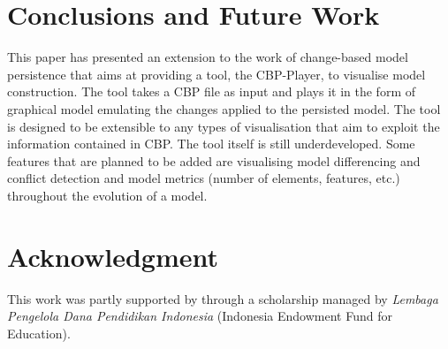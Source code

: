 \documentclass[conference]{IEEEtran}
\begin{document}
\section{Conclusions and Future Work}
\label{sec:conclusions_and_future_work}
This paper has presented an extension to the work of change-based model persistence
that aims at providing a tool, the CBP-Player, to visualise model construction. 
The tool takes a CBP file as input and plays it in the form of graphical model
emulating the changes applied to the persisted model. 
The tool is designed to be extensible to any types of visualisation that aim
to exploit the information contained in CBP. The tool itself is still underdeveloped. 
Some features that are planned to be added are visualising model differencing
and conflict detection and model metrics 
(number of elements, features, etc.) throughout the evolution of a model.



\section*{Acknowledgment}
This work was partly supported by through a scholarship managed by \emph{Lembaga Pengelola Dana Pendidikan Indonesia} (Indonesia Endowment Fund for Education).



\end{document}
